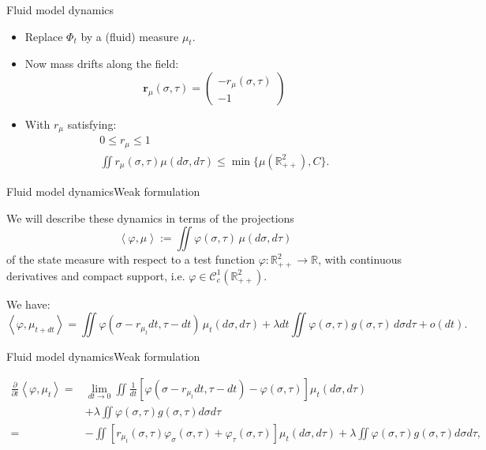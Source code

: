 \documentclass[aspectratio=169]{beamer}
\newcommand{\R}{\mathbb{R}}
\newcommand{\brackets}[2]{\left\langle#1,#2\right\rangle}
\renewcommand{\phi}{\varphi}
\begin{document}
\begin{frame}{Fluid model dynamics}
	\begin{itemize}
		\item Replace $\Phi_t$ by a (fluid) measure $\mu_t$.
		\item Now mass drifts along the field:
			\begin{equation*}
				\mathbf{r}_\mu(\sigma,\tau) = \begin{pmatrix}
				-r_\mu(\sigma,\tau) \\
				-1
				\end{pmatrix}
 			\end{equation*}
		\item With $r_\mu$ satisfying:
		\begin{gather*}
			0\leqslant r_{\mu} \leqslant 1 \\
			\iint r_\mu(\sigma,\tau) \mu(d\sigma,d\tau) \leqslant \min\{\mu(\R^2_{++}),C\}.
		\end{gather*} 
	\end{itemize}
\end{frame}

\begin{frame}{Fluid model dynamics}{Weak formulation}

	We will describe these dynamics in terms of the projections 
\begin{equation*}
	\brackets{\phi}{\mu} := \iint \phi(\sigma,\tau) \, \mu(d\sigma,d\tau)
\end{equation*}
of the state measure with  respect to a test function $\phi:\R^2_{++}\to\R$, with continuous derivatives and compact support, i.e. $\phi \in \mathcal{C}^1_c(\R^2_{++})$.  

\vfill

We have:
	\begin{equation*}
	\brackets{\phi}{\mu_{t+dt}} = \iint \phi(\sigma-r_{\mu_t}dt,\tau-dt) \, \mu_{t}(d\sigma,d\tau) + \lambda dt \iint \phi(\sigma,\tau)g(\sigma,\tau)\, d\sigma d\tau + o(dt).
\end{equation*}

\end{frame}

\begin{frame}{Fluid model dynamics}{Weak formulation}

	\begin{align*}
	\frac{\partial}{\partial t}\brackets{\phi}{\mu_{t}} =& \lim_{dt\to 0} \iint \frac{1}{dt} \left[\phi(\sigma-r_{\mu_t}dt,\tau-dt) - \phi(\sigma,\tau)\right] \mu_{t}(d\sigma,d\tau) \\ 
	&+ \lambda \iint \phi(\sigma,\tau)g(\sigma,\tau) d\sigma d\tau\\
=& - \iint \left[r_{\mu_t}(\sigma,\tau) \phi_\sigma (\sigma,\tau) + \phi_\tau(\sigma,\tau)\right]\mu_t(d\sigma,d\tau) + \lambda \iint \phi(\sigma,\tau)g(\sigma,\tau) d\sigma d\tau,
\end{align*}

\end{frame}
\end{document}
